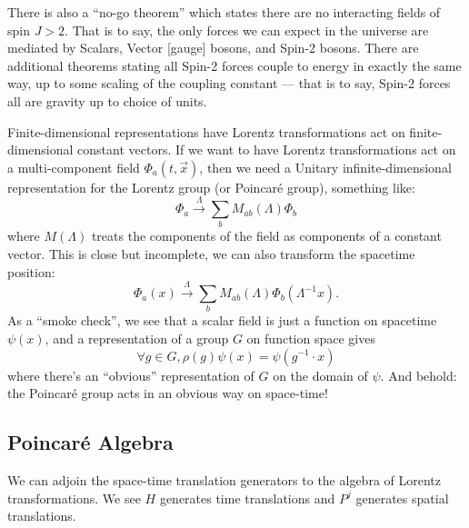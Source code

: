 \begin{ddanger}
There is also a ``no-go theorem'' which states there are no interacting
fields of spin $J>2$. That is to say, the only forces we can expect in
the universe are mediated by Scalars, Vector [gauge] bosons, and Spin-2
bosons. There are additional theorems stating all Spin-2 forces couple
to energy in exactly the same way, up to some scaling of the coupling
constant --- that is to say, Spin-2 forces all are gravity up to choice
of units.
\end{ddanger}

Finite-dimensional representations have Lorentz transformations act on
finite-dimensional constant vectors. If we want to have Lorentz
transformations act on a multi-component field $\Phi_{a}(t,\vec{x})$,
then we need a Unitary infinite-dimensional representation for the
Lorentz group (or Poincar\'e group), something like:
\begin{equation}
\Phi_{a}\xrightarrow{\Lambda}\sum_{b}M_{ab}(\Lambda)\Phi_{b}
\end{equation}
where $M(\Lambda)$ treats the components of the field as components of a
constant vector. This is close but incomplete, we can also transform the
spacetime position:
\begin{equation}
\Phi_{a}(x)\xrightarrow{\Lambda}\sum_{b}M_{ab}(\Lambda)\Phi_{b}(\Lambda^{-1}x).
\end{equation}
As a ``smoke check'', we see that a scalar field is just a function on
spacetime $\psi(x)$, and a representation of a group $G$ on function space
gives
\begin{equation}
\forall g\in G, \rho(g)\psi(x)=\psi(g^{-1}\cdot x)
\end{equation}
where there's an ``obvious'' representation of $G$ on the domain of $\psi$.
And behold: the Poincar\'e group acts in an obvious way on space-time!


\subsection{Poincar\'e Algebra}

\M We can adjoin the space-time translation generators to the algebra of
Lorentz transformations. We see $H$ generates time translations and
$P^{j}$ generates spatial translations.

